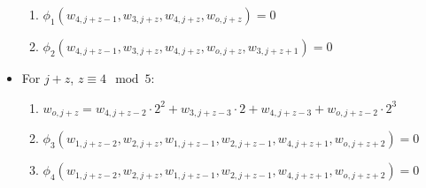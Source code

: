 \begin{itemize}
	\begin{enumerate}
		\item $\phi_1(w_{4, j + z - 1}, w_{3, j + z}, w_{4, j + z}, w_{o, j + z}) = 0$
		\item $\phi_2(w_{4, j + z - 1}, w_{3, j + z}, w_{4, j + z}, w_{o, j + z}, w_{3, j + z + 1}) = 0$
	\end{enumerate}
	\item For $j + z$, $z \equiv 4 \mod 5$:
	\begin{enumerate}
		\item $w_{o, j + z} = w_{4,j + z - 2} \cdot 2^2 + w_{3,j + z - 3} \cdot 2 + w_{4, j + z - 3} + w_{o, j + z - 2} \cdot 2^3$
		\item $\phi_3(w_{1, j + z - 2}, w_{2, j + z}, w_{1, j + z - 1}, w_{2, j + z - 1}, w_{4, j + z + 1}, w_{o, j + z + 2}) = 0$
		\item $\phi_4(w_{1, j + z - 2}, w_{2, j + z}, w_{1, j + z - 1}, w_{2, j + z - 1}, w_{4, j + z + 1}, w_{o, j + z + 2}) = 0$
	\end{enumerate}
\end{itemize}

